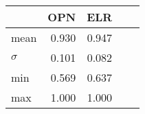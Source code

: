 \begin{tabular}{ l r r r r }
\toprule
         &  OPN   &  ELR   \\
\midrule
mean     &  0.930 & 0.947 \\
$\sigma$ &  0.101 &  0.082 \\
min      &  0.569 & 0.637 \\
max      &  1.000 & 1.000 \\
\bottomrule
\end{tabular}
